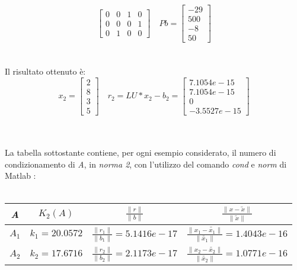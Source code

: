 \begin{description}
\[\begin{bmatrix}
			0 & 0 & 1 & 0 \\
			0 & 0 & 0 & 1 \\
			0 & 1 & 0 & 0 
		\end{bmatrix} \quad
		Pb =\begin{bmatrix}
			-29 \\
			500 \\
			-8  \\
			50               
		\end{bmatrix}
		\]\\\\
	Il risultato ottenuto è:\\
		\[
		x_2 =\begin{bmatrix}
			2 \\
		  	8 \\
		  	3 \\
		  	5 
		\end{bmatrix} \quad
		r_2 = LU*x_2-b_2 =\begin{bmatrix}
			7.1054e-15 \\
		  	7.1054e-15 \\
		  	0 \\
		  	-3.5527e-15 
		\end{bmatrix}
		\]\\\\
\end{description}
La tabella sottostante contiene, per ogni esempio considerato, il numero di condizionamento di \textit{A}, in \textit{norma 2}, con l'utilizzo del comando \textit{cond} e \textit{norm} di Matlab :\\\
\begin{center}
	\begin{tabular}{ | c | c | c | c | }
		\hline
			\textit{A} & $K_2(A)$ & $\frac{\|r\|}{\|b\|}$ & $\frac{\|x-\tilde{x}\|}{\|\tilde{x}\|}$ \\
		\hline
			$A_1$ & $k_1=20.0572$ & $\frac{\|r_1\|}{\|b_1\|}=5.1416e-17$ & $\frac{\|x_1-\tilde{x_1}\|}{\|\tilde{x_1}\|}=1.4043e-16$ \\
			$A_2$ &	$k_2=17.6716$ & $\frac{\|r_2\|}{\|b_2\|}=2.1173e-17$ & $\frac{\|x_2-\tilde{x_2}\|}{\|\tilde{x_2}\|}=1.0771e-16$ \\
		\hline
	\end{tabular}
\end{center}